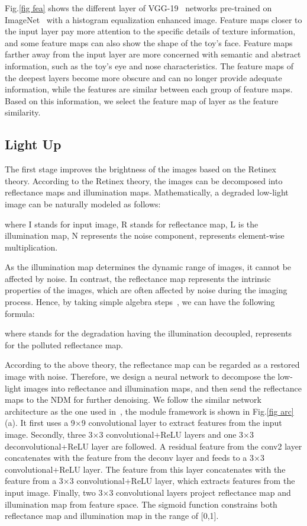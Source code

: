\documentclass[journal]{IEEEtran}
\begin{document}
Fig.\ref{fig fea} shows the different layer of VGG-19~\cite{simonyan2014very} networks pre-trained on ImageNet~\cite{deng2009imagenet} with a histogram equalization enhanced image. Feature maps closer to the input layer pay more attention to the specific details of texture information, and some feature maps can also show the shape of the toy's face. Feature maps farther away from the input layer are more concerned with semantic and abstract information, such as the toy's eye and nose characteristics. The feature maps of the deepest layers become more obscure and can no longer provide adequate information, while the features are similar between each group of feature maps. Based on this information, we select the feature map of  layer as the feature similarity.

\subsection{Light Up}
\label{lightup}
The first stage improves the brightness of the images based on the Retinex theory. According to the Retinex theory, the images can be decomposed into reflectance maps and illumination maps. Mathematically, a degraded low-light image can be naturally modeled as follows:

\noindent where I stands for input image, R stands for reflectance map, L is the illumination map, N represents the noise component,  represents element-wise multiplication. 

As the illumination map determines the dynamic range of images, it cannot be affected by noise. In contrast, the reflectance map represents the intrinsic properties of the images, which are often affected by noise during the imaging process. Hence, by taking simple algebra steps~\cite{zhang2021beyond}, we can have the following formula:

\noindent where  stands for the degradation having the illumination decoupled,  represents for the polluted reflectance map. 

According to the above theory, the reflectance map can be regarded as a restored image with noise. Therefore, we design a neural network to decompose the low-light images into reflectance and illumination maps, and then send the reflectance maps to the NDM for further denoising. We follow the similar network architecture as the one used in~\cite{zhang2020self}, the module framework is shown in Fig.\ref{fig arc}(a). It first uses a 9×9 convolutional layer to extract features from the input image. Secondly, three 3×3 convolutional+ReLU layers and one 3×3 deconvolutional+ReLU layer are followed. A residual feature from the conv2 layer concatenates with the feature from the deconv layer and feeds to a 3×3 convolutional+ReLU layer. The feature from this layer concatenates with the feature from a 3×3 convolutional+ReLU layer, which extracts features from the input image. Finally, two 3×3 convolutional layers project reflectance map and illumination map from feature space. The sigmoid function constrains both reflectance map and illumination map in the range of [0,1].
\end{document}
